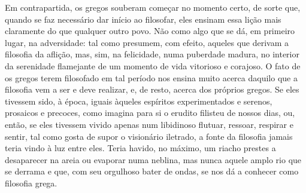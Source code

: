 Em contrapartida, os gregos souberam começar no momento certo, de sorte que,
quando se faz necessário dar início ao filosofar, eles ensinam essa lição
mais claramente do que qualquer outro povo. Não como algo que se dá, em
primeiro lugar, na adversidade: tal como presumem, com efeito, aqueles que
derivam a filosofia da aflição, mas, sim, na felicidade, numa puberdade
madura, no interior da serenidade flamejante de um momento de vida vitorioso
e corajoso. O fato de os gregos terem filosofado em tal período nos ensina
muito acerca daquilo que a filosofia vem a ser e deve realizar, e, de resto,
acerca dos próprios gregos. Se eles tivessem sido, à época, iguais àqueles
espíritos experimentados e serenos, prosaicos e precoces, como imagina para
si o erudito filisteu de nossos dias, ou, então, se eles tivessem vivido
apenas num libidinoso flutuar, ressoar, respirar e sentir, tal como gosta de
supor o visionário iletrado, a fonte da filosofia jamais teria vindo à luz
entre eles. Teria havido, no máximo, um riacho prestes a desaparecer na areia
ou evaporar numa neblina, mas nunca aquele amplo rio que se derrama e que,
com seu orgulhoso bater de ondas, se nos dá a conhecer como filosofia grega.

